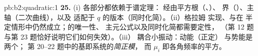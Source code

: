 \begin{solution}{pb:b2:quadratic:1}
\textbf{25.} (i) 各部分都依赖于谱定理：
经由平方根（、）、
界（）、主轴（二次曲线），以及
适配于 $q$ 的版本（同时化简）。（ii）格拉姆
实现、与在
半定情形中仍然成立；的唯一性、
主元公式以及同时化简都需要定性，
（第 12 题与第 23 题恰好说明它们如何失效）。（iii）
耦合小振动：动能（正定）
与势能是两个；
第 20--22 题中的基即系统的\emph{简正模}，
而 $\mu_i$ 即各角频率的平方。
\end{solution}
